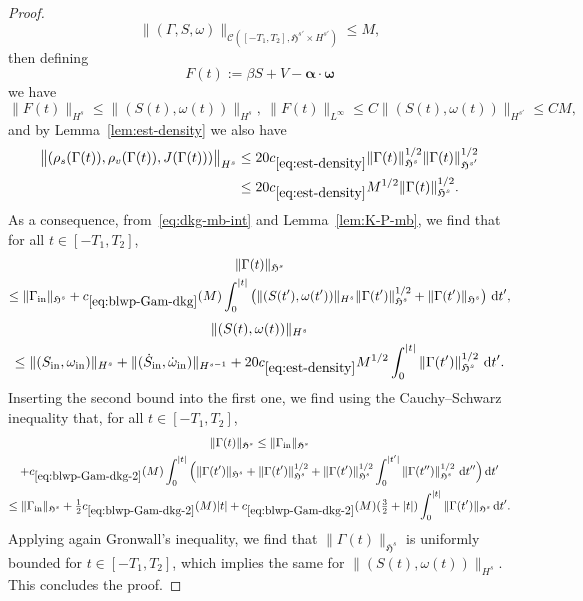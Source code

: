 \documentclass[10pt]{amsart}
\theoremstyle{definition}\newtheorem{defi}[theo]{Definition}\newtheorem{rema}[theo]{Remark}\newtheorem{exam}[theo]{Example}\newtheorem{exem}[theo]{Example}\newtheorem{nota}[theo]{Notation}
\newcommand{\rmin}{\mathrm{in}}
\newcommand{\cC}{\mathcal{C}}
\newcommand{\gH}{\mathfrak{H}}
\newcommand\ii{{\ensuremath {\infty}}}
\renewcommand\d[1]{{\ensuremath{\,\text{d}#1}}}
\begin{document}
\begin{proof}
\[
\|(\Gamma,S,\omega)\|_{\cC\left([-T_1,T_2],\gH^{s'}\times H^{s'}\right)}\leq M,
\]
then defining
\[
F(t):={ \beta}S + V - {\bm \alpha}\cdot {\bm \omega}
\]
we have
\[
\|F(t)\|_{H^s}\leq \|(S(t),\omega(t))\|_{H^s},\ \|F(t)\|_{L^\ii}\leq C\|(S(t),\omega(t))\|_{H^{s'}}\leq C M,
\]
and by Lemma~\ref{lem:est-density} we also have
\begin{align*}
\big\|(\rho_s(\Gamma(t)),\rho_v(\Gamma(t)),J(\Gamma(t)))\big\|_{H^s}&\leq 20 c_{\eqref{eq:est-density}}\|\Gamma(t)\|_{\gH^{s}}^{1/2}\|\Gamma(t)\|_{\gH^{s'}}^{1/2}\\
&\leq 20 c_{\eqref{eq:est-density}} M^{1/2} \|\Gamma(t)\|_{\gH^{s}}^{1/2}.
\end{align*}
As a consequence, from~\eqref{eq:dkg-mb-int} and Lemma~\ref{lem:K-P-mb}, we find that for all $t\in[-T_1,T_2]$,
\begin{multline}\label{eq:blwp-Gam-dkg}
\|\Gamma(t)\|_{\gH^s}\\
\leq\|\Gamma_{\rmin}\|_{\gH^s}+c_{\eqref{eq:blwp-Gam-dkg}}(M)\int_0^{|t|}\big(\|(S(t'),\omega(t'))\|_{H^s}\|\Gamma(t')\|_{\gH^s}^{1/2}+\|\Gamma(t')\|_{\gH^s}\big)\,\d t',
\end{multline}
\begin{multline*}
\|(S(t),\omega(t))\|_{H^s}\\
\leq \|(S_{\rmin},\omega_{\rmin})\|_{H^s}+\|(\dot{S}_{\rmin},\dot{\omega}_{\rmin})\|_{H^{s-1}}+20 c_{\eqref{eq:est-density}} M^{1/2}\int_0^{|t|}\|\Gamma(t')\|_{\gH^{s}}^{1/2}\,\d t'.
\end{multline*}
Inserting the second bound into the first one, we find using the Cauchy--Schwarz inequality that, for all $t\in[-T_1,T_2]$,
\begin{multline}\label{eq:blwp-Gam-dkg-2}
\|\Gamma(t)\|_{\gH^s}
\leq \|\Gamma_{\rmin}\|_{\gH^s}\\
+c_{\eqref{eq:blwp-Gam-dkg-2}}(M)\int_0^{|t|}\Big(\|\Gamma(t')\|_{\gH^s} +\|\Gamma(t')\|_{\gH^s}^{1/2}+\|\Gamma(t')\|_{\gH^s}^{1/2}\int_0^{|t'|}\|\Gamma(t'')\|_{\gH^s}^{1/2}\,\d t''\Big)\d t' 
\\
\leq \|\Gamma_{\rmin}\|_{\gH^s}+\tfrac12c_{\eqref{eq:blwp-Gam-dkg-2}}(M)|t|+ c_{\eqref{eq:blwp-Gam-dkg-2}}(M)(\tfrac32+|t|) \int_0^{|t|} \|\Gamma(t')\|_{\gH^s}\d t'.
\end{multline}
Applying again Gronwall's inequality, we find that $\|\Gamma(t)\|_{\gH^s}$ is uniformly bounded for $t\in[-T_1,T_2]$, which implies the same for $\|(S(t),\omega(t))\|_{H^s}$. This concludes the proof.
\end{proof}
\end{document}
